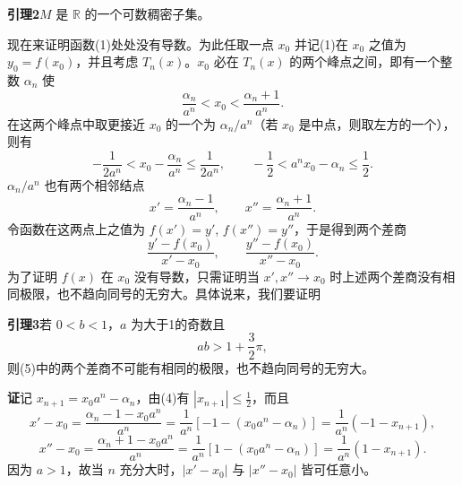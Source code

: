 \textbf{引理2}\quad $M$ 是 $\mathbb R$ 的一个可数稠密子集。

现在来证明函数(1)处处没有导数。为此任取一点 $x_0$ 并记(1)在 $x_0$ 之值为 $y_0=f(x_0)$，并且考虑 $T_n(x)$。$x_0$ 必在 $T_n(x)$ 的两个峰点之间，即有一个整数 $\alpha_n$ 使
\[
 \frac{\alpha_n}{a^n}<x_0<\frac{\alpha_n+1}{a^n}.
\]
在这两个峰点中取更接近 $x_0$ 的一个为 $\alpha_n/a^n$（若 $x_0$ 是中点，则取左方的一个），则有
\begin{equation}
 -\frac1{2a^n}<x_0-\frac{\alpha_n}{a^n}\le\frac1{2a^n},
 \qquad
 -\frac12<a^n x_0-\alpha_n\le\frac12.
 \tag{4}
\end{equation}
$\alpha_n/a^n$ 也有两个相邻结点
\[
 x'=\frac{\alpha_n-1}{a^n},
 \qquad
 x''=\frac{\alpha_n+1}{a^n}.
\]
令函数在这两点上之值为 $f(x')=y'$, $f(x'')=y''$，于是得到两个差商
\begin{equation}
 \frac{y'-f(x_0)}{x'-x_0},
 \qquad
 \frac{y''-f(x_0)}{x''-x_0}.
 \tag{5}
\end{equation}
为了证明 $f(x)$ 在 $x_0$ 没有导数，只需证明当 $x',x''\to x_0$ 时上述两个差商没有相同极限，也不趋向同号的无穷大。具体说来，我们要证明

\textbf{引理3}\quad 若 $0<b<1$，$a$ 为大于1的奇数且
\begin{equation}
 ab>1+\frac32\pi,
 \tag{6}
\end{equation}
则(5)中的两个差商不可能有相同的极限，也不趋向同号的无穷大。

\textbf{证}\quad 记 $x_{n+1}=x_0a^n-\alpha_n$，由(4)有 $|x_{n+1}|\le\frac12$，而且
\[
 x'-x_0=\frac{\alpha_n-1-x_0a^n}{a^n}
 =\frac1{a^n}[-1-(x_0a^n-\alpha_n)]
 =\frac1{a^n}(-1-x_{n+1}),
\]
\[
 x''-x_0=\frac{\alpha_n+1-x_0a^n}{a^n}
 =\frac1{a^n}[1-(x_0a^n-\alpha_n)]
 =\frac1{a^n}(1-x_{n+1}).
\]
因为 $a>1$，故当 $n$ 充分大时，$|x'-x_0|$ 与 $|x''-x_0|$ 皆可任意小。

